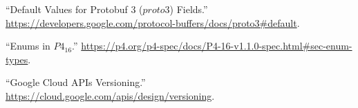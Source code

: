 \documentclass[11pt]{article}
\begin{document}
{{\begin{thebibliography}{35}
\mdbibitemlabel{{}[4]}\textquotedblleft{}Default Values for Protobuf 3 ($proto3$) Fields.\textquotedblright{} \href{https://developers.google.com/protocol-buffers/docs/proto3\%23default}{{\ttfamily https://\hspace{0pt}developers.\hspace{0pt}google.\hspace{0pt}com/\hspace{0pt}protocol-\hspace{0pt}buffers/\hspace{0pt}docs/\hspace{0pt}proto3\#\hspace{0pt}default}}.\label{protodefaults}%

\mdbibitemlabel{{}[5]}\textquotedblleft{}Enums in $P4_{16}$.\textquotedblright{} \href{https://p4.org/p4-spec/docs/P4-16-v1.1.0-spec.html\%23sec-enum-types}{{\ttfamily https://\hspace{0pt}p4.\hspace{0pt}org/\hspace{0pt}p4-\hspace{0pt}spec/\hspace{0pt}docs/\hspace{0pt}P4-\hspace{0pt}16-\hspace{0pt}v1.\hspace{0pt}1.\hspace{0pt}0-\hspace{0pt}spec.\hspace{0pt}html\#\hspace{0pt}sec-\hspace{0pt}enum-\hspace{0pt}types}}.\label{p4enums}%

\mdbibitemlabel{{}[6]}\textquotedblleft{}Google Cloud APIs Versioning.\textquotedblright{} \href{https://cloud.google.com/apis/design/versioning}{{\ttfamily https://\hspace{0pt}cloud.\hspace{0pt}google.\hspace{0pt}com/\hspace{0pt}apis/\hspace{0pt}design/\hspace{0pt}versioning}}.\label{apiversioning}%


\end{thebibliography}}}
\end{document}
